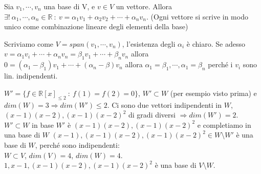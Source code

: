 \begin{proposition}
Sia $v_1, \cdots, v_n$ una base di V, e $v \in V$ un vettore. Allora $\exists ! \: \alpha_1, \cdots, \alpha_n \in \mathbb{R} \::\: v = \alpha_1v_1 + \alpha_2v_2 + \cdots + \alpha_nv_n$. (Ogni vettore si scrive in modo unico come combinazione lineare degli elementi della base)
\end{proposition}

\begin{demostration}
Scriviamo come $V = span(v_1, \cdots, v_n)$, l'esistenza degli $\alpha_i$ è chiaro. Se adesso $v = \alpha_1v_i + \cdots + \alpha_nv_n = \beta_1v_1 + \cdots + \beta_nv_n$ allora $0 = (\alpha_1 - \beta_1)v_1 + \cdots + (\alpha_n - \beta)v_n$ allora $\alpha_1 = \beta_1, \cdots, \alpha_1 = \beta_n$ perché i $v_i$ sono lin. indipendenti.
\end{demostration}

\begin{example}
$W' = \{f \in \mathbb{R}[x]_{\leq 2} \::\: f(1) = f(2) = 0\}$, $W' \subset W$ (per esempio visto prima) e $dim(W) = 3 \Longrightarrow dim(W') \leq 2$. Ci sono due vettori indipendenti in $W$, $(x-1)(x-2), (x-1)(x-2)^2$ di gradi diversi $\Longrightarrow dim(W') = 2$.\\
$W' \subset W$ in base $W'$ è $(x-1)(x-2), (x-1)(x-2)^2$ e completiamo in una base di $W$ $(x-1), (x-1)(x-2), (x-1)(x-2)^2 \in W \setminus W'$ è una base di $W$, perché sono indipendenti:\\
$W \subset V$, $dim(V) = 4$, $dim(W) = 4$. $1, x-1, (x-1)(x-2), (x-1)(x-2)^2$ è una base di $V \setminus W$.
\end{example}

